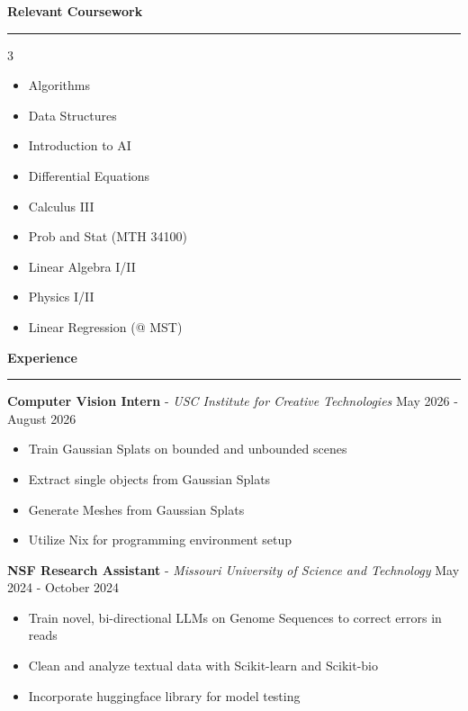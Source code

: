 \documentclass[11pt]{article}
\begin{document}
\textbf{Relevant Coursework}\par
\vspace{-12pt}
\noindent\rule{\textwidth}{0.4pt}
\vspace{-24pt}  %
\begin{multicols}{3}
    \begin{itemize}[noitemsep, topsep=0pt, partopsep=0pt, parsep=0pt, itemsep=0pt]
        \small
        \item Algorithms
        \item Data Structures
        \item Introduction to AI
        \item Differential Equations
        \item Calculus III
        \item Prob and Stat (MTH 34100)
        \item Linear Algebra I/II
        \item Physics I/II
        \item Linear Regression (@ MST)
    \end{itemize}
\end{multicols}
\vspace{-10pt}  %

\textbf{Experience}\par
\vspace{-12pt}
\noindent\rule{\textwidth}{0.4pt}

\textbf{Computer Vision Intern} - \textsl{USC Institute for Creative Technologies} \hfill May 2026 - August 2026
\begin{itemize}[noitemsep, topsep=0pt, partopsep=0pt, parsep=0pt, itemsep=0pt]
    \small
    \item Train Gaussian Splats on bounded and unbounded scenes
    \item Extract single objects from Gaussian Splats
    \item Generate Meshes from Gaussian Splats
    \item Utilize Nix for programming environment setup
\end{itemize}


\textbf{NSF Research Assistant} - \textsl{Missouri University of Science and Technology} \hfill May 2024 - October 2024
\begin{itemize}[noitemsep, topsep=0pt, partopsep=0pt, parsep=0pt, itemsep=0pt]
    \small
    \item Train novel, bi-directional LLMs on Genome Sequences to correct  errors in reads
    \item Clean and analyze textual data with Scikit-learn and Scikit-bio
    \item Incorporate huggingface library for model testing
\end{itemize}
\end{document}
